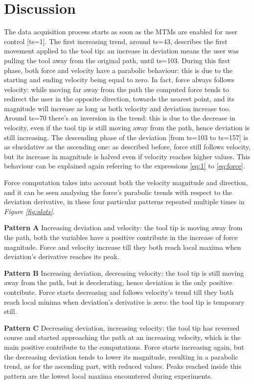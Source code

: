 \documentclass[conference]{IEEEtran}
\begin{document}
\section{Discussion}

The data acquisition process starts as soon as the MTMs are enabled
for user control [ts=1]. The first increasing trend, around ts=43,
describes the first movement applied to the tool tip: an increase in
deviation means the user was pulling the tool away from the original
path, until ts=103. During this first phase, both force and velocity
have a parabolic behaviour: this is due to the starting and ending
velocity being equal to zero. In fact, force always follows velocity:
while moving far away from the path the computed force tends to
redirect the user in the opposite direction, towards the nearest
point, and its magnitude will increase as long as both velocity and
deviation increase too. Around ts=70 there’s an inversion in the
trend: this is due to the decrease in velocity, even if the tool tip
is still moving away from the path, hence deviation is still
increasing. The descending phase of the deviation [from ts=103 to
ts=157] is as elucidative as the ascending one: as described before,
force still follows velocity, but its increase in magnitude is halved
even if velocity reaches higher values. This behaviour can be
explained again referring to the expressions \ref{eq:1} to
\ref{eq:force}. 

Force computation takes into account both the velocity magnitude and
direction, and it can be seen analysing the force’s parabolic trends
with respect to the deviation derivative, in these four particular
patterns repeated multiple times in \textit{Figure \ref{fig:plots}}.

\textbf{Pattern A  } Increasing deviation and velocity: the tool tip
is moving away from the path, both the variables have a positive
contribute in the increase of force magnitude. Force and velocity
increase till they both reach local maxima when deviation’s derivative
reaches its peak.

\textbf{Pattern B }  Increasing deviation, decreasing velocity: the
tool tip is still moving away from the path, but is decelerating,
hence deviation is the only positive contribute. Force starts
decreasing and follows velocity’s trend till they both reach local
minima when deviation’s derivative is zero: the tool tip is temporary
still.

\textbf{Pattern C } Decreasing deviation, increasing velocity: the
tool tip has reversed course and started approaching the path at an
increasing velocity, which is the main positive contribute to the
computations. Force starts increasing again, but the decreasing
deviation tends to lower its magnitude, resulting in a parabolic
trend, as for the ascending part, with reduced values. Peaks reached
inside this pattern are the lowest local maxima encountered during
experiments.
\end{document}
